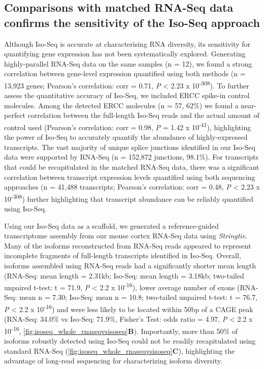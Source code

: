 	
\newpage
\subsection{Comparisons with matched RNA-Seq data confirms the sensitivity of the Iso-Seq approach} 
\label{sec: whole_isoseqvsrnaseq}
Although Iso-Seq is accurate at characterising RNA diversity\cite{Wang2019}, its sensitivity for quantifying gene expression has not been systematically explored. Generating highly-parallel RNA-Seq data on the same samples (n = 12), we found a strong correlation between gene-level expression quantified using both methods (n = 13,923 genes; Pearson's correlation: corr = 0.71, \textit{P} < 2.23 x 10\textsuperscript{-308}). To further assess the quantitative accuracy of Iso-Seq, we included ERCC spike-in control molecules. Among the detected ERCC molecules (n = 57, 62\%) we found a near-perfect correlation between the full-length Iso-Seq reads and the actual amount of control used (Pearson's correlation: corr = 0.98, \textit{P} = 1.42 x 10\textsuperscript{-41}), highlighting the power of Iso-Seq to accurately quantify the abundance of highly-expressed transcripts. The vast majority of unique splice junctions identified in our Iso-Seq data were supported by RNA-Seq (n = 152,872 junctions, 98.1\%). For transcripts that could be recapitulated in the matched RNA-Seq data, there was a significant correlation between transcript expression levels quantified using both sequencing approaches (n = 41,488 transcripts; Pearson's correlation: corr = 0.48, \textit{P} < 2.23 x 10\textsuperscript{-308}) further highlighting that transcript abundance can be reliably quantified using Iso-Seq. 

Using our Iso-Seq data as a scaffold, we generated a reference-guided transcriptome assembly from our mouse cortex RNA-Seq data using \textit{Stringtie}\cite{Pertea2015}. Many of the isoforms reconstructed from RNA-Seq reads appeared to represent incomplete fragments of full-length transcripts identified in Iso-Seq. Overall, isoforms assembled using RNA-Seq reads had a significantly shorter mean length (RNA-Seq: mean length = 2.31kb; Iso-Seq: mean length = 3.18kb; two-tailed unpaired t-test: t = 71.9, \textit{P} < 2.2 x 10\textsuperscript{-16}), lower average number of exons (RNA-Seq: mean n = 7.30; Iso-Seq: mean n = 10.8; two-tailed unpaired t-test: t = 76.7, \textit{P} < 2.2 x 10\textsuperscript{-16}) and were less likely to be located within 50bp of a CAGE peak (RNA-Seq: 34.0\% vs Iso-Seq: 71.9\%, Fisher’s Test: odds ratio = 4.97, \textit{P} < 2.2 x 10\textsuperscript{-16}, \cref{fig:isoseq_whole_rnaseqvsisoseq}\textbf{B}). Importantly, more than 50\% of isoforms robustly detected using Iso-Seq could not be readily recapitulated using standard RNA-Seq (\cref{fig:isoseq_whole_rnaseqvsisoseq}\textbf{C}), highlighting the advantage of long-read sequencing for characterizing isoform diversity.%


